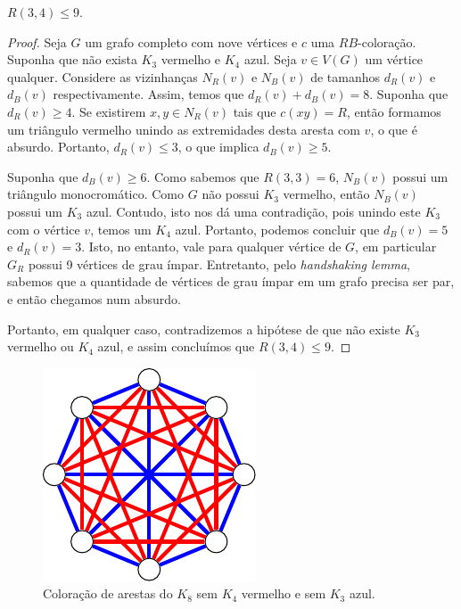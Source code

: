 \begin{proposition}
\label{prelim:thm:r34}
$R(3,4) \leq 9$.
\end{proposition}
\begin{proof}
Seja $G$ um grafo completo com nove vértices e $c$ uma $RB$-coloração.
Suponha que não exista $K_3$ vermelho e $K_4$ azul. Seja $v \in V(G)$ um vértice qualquer. Considere as vizinhanças $N_R(v)$ e $N_B(v)$ de tamanhos $d_R(v)$ e $d_B(v)$ respectivamente. Assim, temos que $d_R(v) + d_B(v) = 8$. Suponha que $d_R(v) \geq 4$. Se existirem $x,y \in N_R(v)$ tais que $c(xy) = R$, então formamos um triângulo vermelho unindo as extremidades desta aresta com $v$, o que é absurdo. Portanto, $d_R(v) \leq 3$, o que implica $d_B(v) \geq 5$.

Suponha que $d_B(v) \geq 6$. Como sabemos que $R(3,3) = 6$, $N_B(v)$ possui um triângulo monocromático. Como $G$ não possui $K_3$ vermelho, então $N_B(v)$ possui um $K_3$ azul. Contudo, isto nos dá uma contradição, pois unindo este $K_3$ com o vértice $v$, temos um $K_4$ azul. Portanto, podemos concluir que $d_B(v) = 5$ e $d_R(v) = 3$. Isto, no entanto, vale para qualquer vértice de $G$, em particular $G_R$ possui 9 vértices de grau ímpar.
Entretanto, pelo \emph{handshaking lemma}, sabemos que a quantidade de vértices de grau ímpar em um grafo precisa ser par, e então chegamos num absurdo.

Portanto, em qualquer caso, contradizemos a hipótese de que não existe $K_3$ vermelho ou $K_4$ azul, e assim concluímos que $R(3,4) \leq 9$.
\end{proof}

\begin{figure}[ht!]
\centering
\includegraphics{figures/2_prelim_1_r34lb}
\caption{Coloração de arestas do $K_8$ sem $K_4$ vermelho e sem $K_3$ azul.}
\label{prelim:fig:exr34}
\end{figure}

